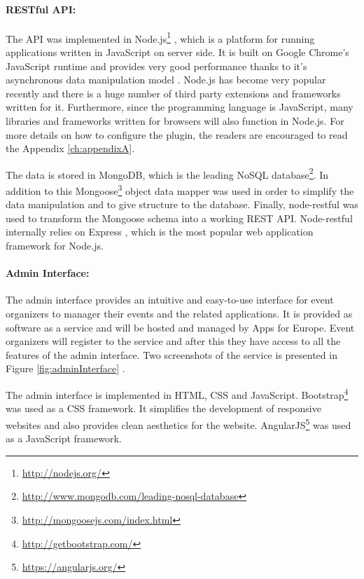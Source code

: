 \paragraph{RESTful API:}
The API was implemented in Node.js\footnote{\url{http://nodejs.org/}} , which is a platform for running applications written in JavaScript on server side. It is built on Google Chrome's JavaScript runtime and provides very good performance thanks to it's asynchronous data manipulation model . Node.js has become very popular recently and there is a huge number of third party extensions and frameworks written for it. Furthermore, since the programming language is JavaScript, many libraries and frameworks written for browsers will also function in Node.js. For more details on how to configure the plugin, the readers are encouraged to read the Appendix \ref{ch:appendixA}.

The data is stored in MongoDB, which is the leading NoSQL database\footnote{\url{http://www.mongodb.com/leading-nosql-database}}. In addition to this Mongoose\footnote{\url{http://mongoosejs.com/index.html}} object data mapper  was used in order to simplify the data manipulation and to give structure to the database. Finally, node-restful  was used to transform the Mongoose schema into a working REST API. Node-restful internally relies on Express , which is the most popular web application framework for Node.js.

\paragraph{Admin Interface:}
The admin interface provides an intuitive and easy-to-use interface for event organizers to manager their events and the related applications. It is provided as software as a service and will be hosted and managed by Apps for Europe. Event organizers will register to the service and after this they have access to all the features of the admin interface. Two screenshots of the service is presented in Figure \ref{fig:adminInterface} .

The admin interface is implemented in HTML, CSS and JavaScript. Bootstrap\footnote{\url{http://getbootstrap.com/}}  was used as a CSS framework. It simplifies the development of responsive websites and also provides clean aesthetics for the website. AngularJS\footnote{\url{https://angularjs.org/}}  was used as a JavaScript framework.


